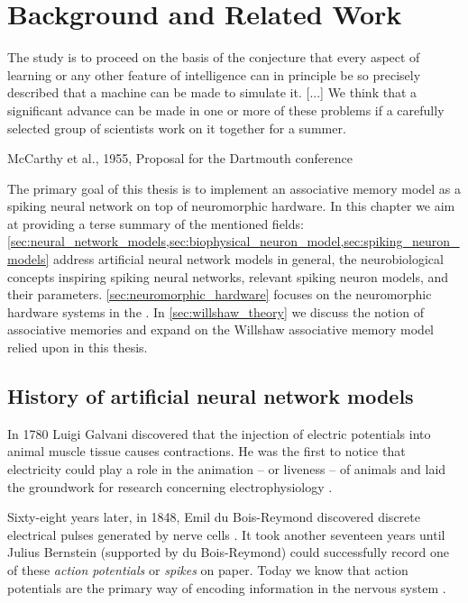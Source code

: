 \chapter{Background and Related Work}
\label{chp:related_work}

\epigraph{The study is to proceed on the basis of the conjecture that every aspect of learning or any other feature of intelligence can in principle be so precisely described that a machine can be made to simulate it. \textnormal{[...]} We think that a significant advance can be made in one or more of these problems if a carefully selected group of scientists work on it together for a summer.}{McCarthy et al., 1955, Proposal for the Dartmouth conference}

The primary goal of this thesis is to implement an associative memory model as a spiking neural network on top of neuromorphic hardware. In this chapter we aim at providing a terse summary of the mentioned fields: \cref{sec:neural_network_models,sec:biophysical_neuron_model,sec:spiking_neuron_models} address artificial neural network models in general, the neurobiological concepts inspiring spiking neural networks, relevant spiking neuron models, and their parameters. \cref{sec:neuromorphic_hardware} focuses on the neuromorphic hardware systems in the \HBP. In \cref{sec:willshaw_theory} we discuss the notion of associative memories and expand on the Willshaw associative memory model relied upon in this thesis.

%
%

\section{History of artificial neural network models}
\label{sec:neural_network_models}

In 1780 Luigi Galvani discovered that the injection of electric potentials into animal muscle tissue causes contractions. He was the first to notice that electricity could play a role in the animation -- or liveness -- of animals and laid the groundwork for research concerning electrophysiology \cite{piccolino1997luigi}.

Sixty-eight years later, in 1848, Emil du Bois-Reymond discovered discrete electrical pulses generated by nerve cells \cite{pearce2001emil}. It took another seventeen years until Julius Bernstein (supported by du Bois-Reymond) could successfully record one of these \emph{action potentials} or \emph{spikes} on paper. Today we know that action potentials are the primary way of encoding information in the nervous system \cite{schuetze1983discovery}.


